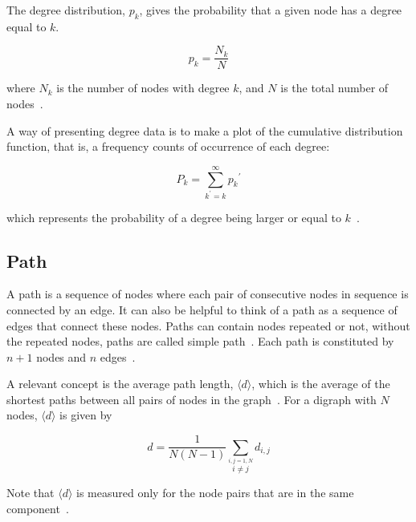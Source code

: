 \documentclass{article}
\begin{document}
\begin{multicols}{2}
The degree distribution, $p_k$, gives the probability that a given node has a degree equal to $k$.

$$
p_k=\frac{N_k}{N}
$$

where $N_k$ is the number of nodes with degree $k$, and $N$ is the total number of nodes~\cite{NS}.

A way of presenting degree data is to make a plot of the cumulative distribution function, that is, a frequency counts of occurrence of each degree:

$$
P_k=\sum\limits_{k^{\prime}=k}^{\infty}{p_k}^{\prime}
$$

which represents the probability of a degree being larger or equal to $k$~\cite{newman2003structure}.


\subsection{Path}

A path is a sequence of nodes where each pair of consecutive nodes in sequence is connected by an edge. It can also be helpful to think of a path as a sequence of edges that connect these nodes. Paths can contain nodes repeated or not, without the repeated nodes, paths are called simple path~\cite{NCM}. Each path is constituted by $n+1$ nodes and $n$ edges~\cite{NS}.

A relevant concept is the average path length, $\langle d \rangle$, which is the average of the shortest paths between all pairs of nodes in the graph~\cite{NS}. For a digraph with $N$ nodes, $\langle d \rangle$ is given by

$$
d=\frac{1}{N(N-1)}\sum_{\stackrel{i,j=1,N}{i \neq j}}d_{i,j}
$$

Note that $\langle d \rangle$ is measured only for the node pairs that are in the same component~\cite{NS}.



\end{multicols}
\end{document}
